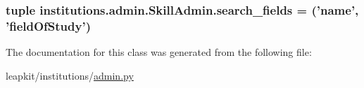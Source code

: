 \hypertarget{classinstitutions_1_1admin_1_1_skill_admin_a0371db06f45679601d046542991c51ad}{
\subsubsection[{search\-\_\-fields}]{\setlength{\rightskip}{0pt plus 5cm}tuple institutions.\-admin.\-Skill\-Admin.\-search\-\_\-fields = ('name', 'field\-Of\-Study')\hspace{0.3cm}{\ttfamily [static]}}}\label{classinstitutions_1_1admin_1_1_skill_admin_a0371db06f45679601d046542991c51ad}


The documentation for this class was generated from the following file\-:\begin{DoxyCompactItemize}
\item 
leapkit/institutions/\hyperlink{institutions_2admin_8py}{admin.\-py}\end{DoxyCompactItemize}
